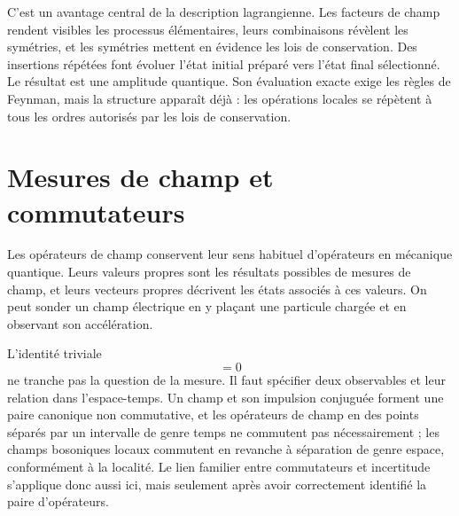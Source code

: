 C’est un avantage central de la description lagrangienne. Les facteurs de champ rendent visibles les processus élémentaires, leurs combinaisons révèlent les symétries, et les symétries mettent en évidence les lois de conservation. Des insertions répétées font évoluer l’état initial préparé vers l’état final sélectionné. Le résultat est une amplitude quantique. Son évaluation exacte exige les règles de Feynman, mais la structure apparaît déjà : les opérations locales se répètent à tous les ordres autorisés par les lois de conservation.

\section{Mesures de champ et commutateurs}

Les opérateurs de champ conservent leur sens habituel d’opérateurs en mécanique quantique. Leurs valeurs propres sont les résultats possibles de mesures de champ, et leurs vecteurs propres décrivent les états associés à ces valeurs. On peut sonder un champ électrique en y plaçant une particule chargée et en observant son accélération.

\begin{classroomqa}
\end{classroomqa}

L’identité triviale
\begin{equation}
[\phi(x),\phi(x)]=0
\end{equation}
ne tranche pas la question de la mesure. Il faut spécifier deux observables et leur relation dans l’espace-temps. Un champ et son impulsion conjuguée forment une paire canonique non commutative, et les opérateurs de champ en des points séparés par un intervalle de genre temps ne commutent pas nécessairement ; les champs bosoniques locaux commutent en revanche à séparation de genre espace, conformément à la localité. Le lien familier entre commutateurs et incertitude s’applique donc aussi ici, mais seulement après avoir correctement identifié la paire d’opérateurs.

